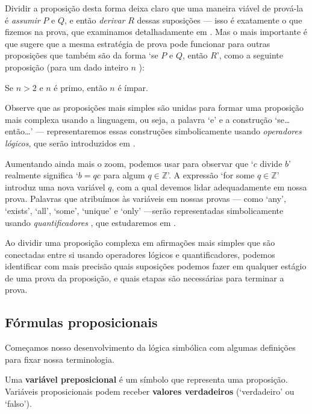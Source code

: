 Dividir a proposição desta forma deixa claro que uma maneira viável de prová-la é \textit{assumir} $P$ e $Q$, e então \textit{derivar} $R$ dessas suposições --- isso é exatamente o que fizemos na prova, que examinamos detalhadamente em . Mas o mais importante é que sugere que a mesma estratégia de prova pode funcionar para outras proposições que também são da forma `se $P$ e $Q$, então $R$', como a seguinte proposição (para um dado inteiro $n$ ):

\begin{center}
Se $n > 2$ e $n$ é primo, então $n$ é ímpar.
\end{center}

Observe que as proposições mais simples são unidas para formar uma proposição mais complexa usando a linguagem, ou seja, a palavra `e' e a construção `se\dots{} então\dots{}' --- representaremos essas construções simbolicamente usando \textit {operadores lógicos}, que serão introduzidos em .

Aumentando ainda mais o zoom, podemos usar  para observar que `$c$ divide $b$' realmente significa `$b = qc$ para algum $q \in \mathbb{Z}$'. A expressão `for some $q \in \mathbb{Z}$' introduz uma nova variável $q$, com a qual devemos lidar adequadamente em nossa prova. Palavras que atribuímos às variáveis ​​em nossas provas --- como `any', `exists', `all', `some', `unique' e `only' ---serão representadas simbolicamente usando \textit{quantificadores} , que estudaremos em .

Ao dividir uma proposição complexa em afirmações mais simples que são conectadas entre si usando operadores lógicos e quantificadores, podemos identificar com mais precisão quais suposições podemos fazer em qualquer estágio de uma prova da proposição, e quais etapas são necessárias para terminar a prova.

\subsection*{Fórmulas proposicionais}

Começamos nosso desenvolvimento da lógica simbólica com algumas definições para fixar nossa terminologia.

\begin{definition}
\label{defPropositionalVariable}
Uma \textbf{variável preposicional} é um símbolo que representa uma proposição. Variáveis ​​proposicionais podem receber \textbf{valores verdadeiros} (`verdadeiro' ou `falso').
\end{definition}

